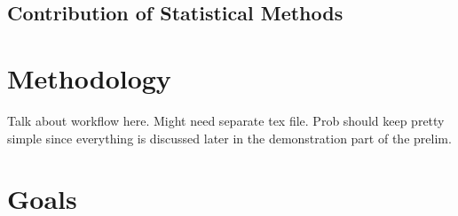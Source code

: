 \subsection{Contribution of Statistical Methods}


\section{Methodology}
\label{sec:methodology}

Talk about workflow here. Might need separate tex file. Prob should keep pretty
simple since everything is discussed later in the demonstration part of the
prelim. 

\section{Goals}

